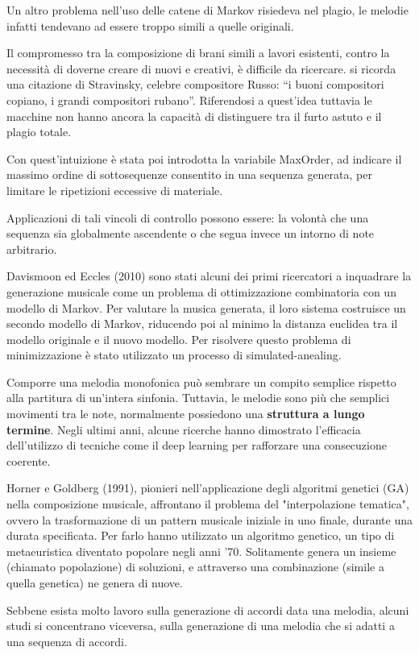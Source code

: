 \documentclass[a4paper,12pt]{report}
\begin{document}
Un altro problema nell'uso delle catene di Markov risiedeva nel plagio, le melodie infatti tendevano ad essere troppo simili a quelle originali.

Il compromesso tra la composizione di brani simili a lavori esistenti, contro la necessità di doverne creare di nuovi e creativi, è difficile da ricercare. 
si ricorda una citazione di Stravinsky, celebre compositore Russo: “i buoni compositori copiano, i grandi compositori rubano”.
Riferendosi a quest'idea tuttavia le macchine non hanno ancora la capacità di distinguere tra il furto astuto e il plagio totale.

Con quest'intuizione è stata poi introdotta la variabile MaxOrder, ad indicare il massimo ordine di sottosequenze consentito in una sequenza generata, per limitare le ripetizioni eccessive di materiale.

Applicazioni di tali vincoli di controllo possono essere: la volontà che una sequenza sia globalmente ascendente o che segua invece un intorno di note arbitrario.

Davismoon ed Eccles (2010) sono stati alcuni dei primi ricercatori a inquadrare la generazione musicale come un problema di ottimizzazione combinatoria con un modello di Markov. 
Per valutare la musica generata, il loro sistema costruisce un secondo modello di Markov, riducendo poi al minimo la distanza euclidea tra il modello originale e il nuovo modello. 
Per risolvere questo problema di minimizzazione è stato utilizzato un processo di simulated-anealing.

Comporre una melodia monofonica può sembrare un compito semplice rispetto alla partitura di un'intera sinfonia. 
Tuttavia, le melodie sono più che semplici movimenti tra le note, normalmente possiedono una \textbf{struttura a lungo termine}. 
Negli ultimi anni, alcune ricerche hanno dimostrato l’efficacia dell’utilizzo di tecniche come il deep learning per rafforzare una consecuzione coerente.

Horner e Goldberg (1991), pionieri nell'applicazione degli algoritmi genetici (GA) nella composizione musicale, affrontano il problema del "interpolazione tematica", ovvero la trasformazione di un pattern musicale iniziale in uno finale, durante una durata specificata. 
Per farlo hanno utilizzato un algoritmo genetico, un tipo di metaeuristica diventato popolare negli anni '70. 
Solitamente genera un insieme (chiamato popolazione) di soluzioni, e attraverso una combinazione (simile a quella genetica) ne genera di nuove.

Sebbene esista molto lavoro sulla generazione di accordi data una melodia, alcuni studi si concentrano viceversa, sulla generazione di una melodia che si adatti a una sequenza di accordi.
\end{document}
